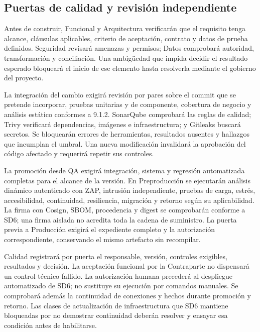 \subsection{Puertas de calidad y revisión independiente}
Antes de construir, Funcional y Arquitectura verificarán que el requisito tenga alcance, cláusulas aplicables, criterio de aceptación, contrato y datos de prueba definidos. Seguridad revisará amenazas y permisos; Datos comprobará autoridad, transformación y conciliación. Una ambigüedad que impida decidir el resultado esperado bloqueará el inicio de ese elemento hasta resolverla mediante el gobierno del proyecto.

La integración del cambio exigirá revisión por pares sobre el commit que se pretende incorporar, pruebas unitarias y de componente, cobertura de negocio y análisis estático conformes a 9.1.2. SonarQube comprobará las reglas de calidad; Trivy verificará dependencias, imágenes e infraestructura; y Gitleaks buscará secretos. Se bloquearán errores de herramientas, resultados ausentes y hallazgos que incumplan el umbral. Una nueva modificación invalidará la aprobación del código afectado y requerirá repetir sus controles. \parencite[art.~24, p.~17]{sd9-ba}

La promoción desde QA exigirá integración, sistema y regresión automatizada completas para el alcance de la versión. En Preproducción se ejecutarán análisis dinámico autenticado con ZAP, intrusión independiente, pruebas de carga, estrés, accesibilidad, continuidad, resiliencia, migración y retorno según su aplicabilidad. La firma con Cosign, SBOM, procedencia y digest se comprobarán conforme a SD6; una firma aislada no acredita toda la cadena de suministro. La puerta previa a Producción exigirá el expediente completo y la autorización correspondiente, conservando el mismo artefacto sin recompilar. \parencites[sec.~6.2, DevSecOps, ambientes y cadena de suministro]{sd9-sd6}[20.1, pp.~34--35]{sd9-bt}

Calidad registrará por puerta el responsable, versión, controles exigibles, resultados y decisión. La aceptación funcional por la Contraparte no dispensará un control técnico fallido. La autorización humana precederá al despliegue automatizado de SD6; no sustituye su ejecución por comandos manuales. Se comprobará además la continuidad de conexiones y hechos durante promoción y retorno. Las clases de actualización de infraestructura que SD6 mantiene bloqueadas por no demostrar continuidad deberán resolver y ensayar esa condición antes de habilitarse. \parencite[sec.~6.2, Liberación, migración y aceptación]{sd9-sd6}


